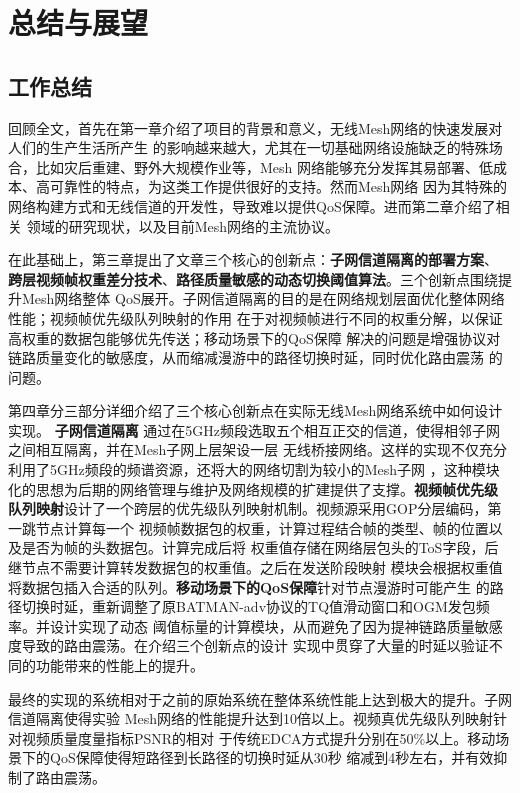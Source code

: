 \chapter{总结与展望}
\label{cha:conclusion}

\section{工作总结}
回顾全文，首先在第一章介绍了项目的背景和意义，无线Mesh网络的快速发展对人们的生产生活所产生
的影响越来越大，尤其在一切基础网络设施缺乏的特殊场合，比如灾后重建、野外大规模作业等，Mesh
网络能够充分发挥其易部署、低成本、高可靠性的特点，为这类工作提供很好的支持。然而Mesh网络
因为其特殊的网络构建方式和无线信道的开发性，导致难以提供QoS保障。进而第二章介绍了相关
领域的研究现状，以及目前Mesh网络的主流协议。

在此基础上，第三章提出了文章三个核心的创新点：\textbf{子网信道隔离的部署方案}、
\textbf{跨层视频帧权重差分技术}、\textbf{路径质量敏感的动态切换阈值算法}。三个创新点围绕提升Mesh网络整体
QoS展开。子网信道隔离的目的是在网络规划层面优化整体网络性能；视频帧优先级队列映射的作用
在于对视频帧进行不同的权重分解，以保证高权重的数据包能够优先传送；移动场景下的QoS保障
解决的问题是增强协议对链路质量变化的敏感度，从而缩减漫游中的路径切换时延，同时优化路由震荡
的问题。

第四章分三部分详细介绍了三个核心创新点在实际无线Mesh网络系统中如何设计实现。\textbf{
子网信道隔离}
通过在5GHz频段选取五个相互正交的信道，使得相邻子网之间相互隔离，并在Mesh子网上层架设一层
无线桥接网络。这样的实现不仅充分利用了5GHz频段的频谱资源，还将大的网络切割为较小的Mesh子网
，这种模块化的思想为后期的网络管理与维护及网络规模的扩建提供了支撑。\textbf{视频帧优先级
队列映射}设计了一个跨层的优先级队列映射机制。视频源采用GOP分层编码，第一跳节点计算每一个
视频帧数据包的权重，计算过程结合帧的类型、帧的位置以及是否为帧的头数据包。计算完成后将
权重值存储在网络层包头的ToS字段，后继节点不需要计算转发数据包的权重值。之后在发送阶段映射
模块会根据权重值将数据包插入合适的队列。\textbf{移动场景下的QoS保障}针对节点漫游时可能产生
的路径切换时延，重新调整了原BATMAN-adv协议的TQ值滑动窗口和OGM发包频率。并设计实现了动态
阈值标量的计算模块，从而避免了因为提神链路质量敏感度导致的路由震荡。在介绍三个创新点的设计
实现中贯穿了大量的时延以验证不同的功能带来的性能上的提升。

最终的实现的系统相对于之前的原始系统在整体系统性能上达到极大的提升。子网信道隔离使得实验
Mesh网络的性能提升达到10倍以上。视频真优先级队列映射针对视频质量度量指标PSNR的相对
于传统EDCA方式提升分别在50\%以上。移动场景下的QoS保障使得短路径到长路径的切换时延从30秒
缩减到4秒左右，并有效抑制了路由震荡。

